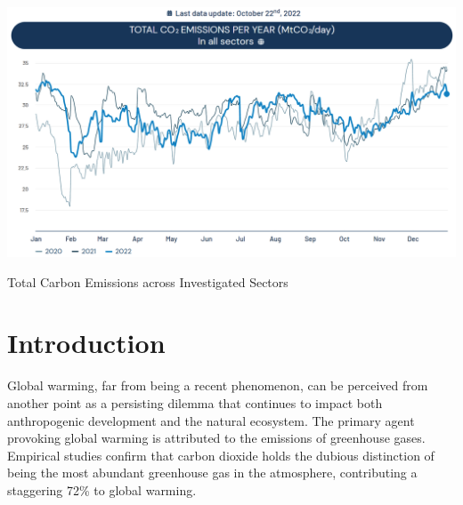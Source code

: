 \documentclass[sigconf, authordraft]{acmart}
\begin{document}
	 
	 


	\begin{teaserfigure}
		\includegraphics[width=\textwidth]{figures/total_carbon_emissions.png}
		\caption{Total Carbon Emissions across Investigated Sectors}
		\Description{} \label{fig:teaser}
	\end{teaserfigure}

	  

	\maketitle


	\section{Introduction}
	Global warming, far from being a recent phenomenon, can be perceived from another
	point as a persisting dilemma that continues to impact both anthropogenic development
	and the natural ecosystem. The primary agent provoking global warming is
	attributed to the emissions of greenhouse gases. Empirical studies confirm that
	carbon dioxide holds the dubious distinction of being the most abundant greenhouse
	gas in the atmosphere, contributing a staggering 72\% to global warming.
\end{document}
